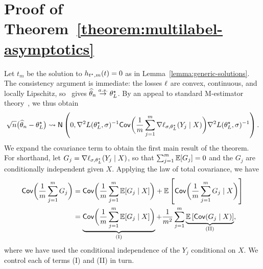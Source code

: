 \section{Proof of Theorem~\ref{theorem:multilabel-asymptotics}}
\label{sec:proof-multilabel-asymptotics}

Let $t_m$ be the solution to $h_{t^\star,m}(t) = 0$ as in
Lemma~\ref{lemma:generic-solutions}. The consistency argument is
immediate: the losses $\ell$ are convex, continuous, and locally Lipschitz,
so~\citet[Thm.~5.4]{ShapiroDeRu09} gives $\widehat{\theta}_n
\stackrel{a.s.}{\rightarrow} \theta^\star_L$. By an appeal to standard
M-estimator theory~\cite[e.g.][Thm.~5.23]{VanDerVaart98},
we thus obtain
\begin{equation}
	\label{eqn:multilabel-basic-asymptote}
	\sqrt{n} \big(\widehat{\theta}_n - \theta^\star_L\big)
	\rightsquigarrow \mathsf{N}\left(0, \nabla^2 L(\theta^\star_L, \sigma)^{-1}
	\mathsf{Cov}\bigg(\frac{1}{m} \sum_{j = 1}^m
	\nabla \ell_{\sigma,\theta^\star_L}(Y_j \mid X)\bigg)
	\nabla^2 L(\theta^\star_L, \sigma)^{-1} \right).
\end{equation}
We expand the covariance term to obtain the first main result of the
theorem. For shorthand, let $G_j = \nabla \ell_{\sigma,\theta^\star_L}(Y_j
\mid X)$, so that $\sum_{j = 1}^m \mathbb{E}[G_j] = 0$ and the $G_j$ are
conditionally independent given $X$. Applying the law of total covariance,
we have
\begin{align*}
	\mathsf{Cov}\bigg(\frac{1}{m} \sum_{j = 1}^m G_j\bigg)
	& = \mathsf{Cov}\bigg(\frac{1}{m} \sum_{j = 1}^m
	\mathbb{E}[G_j \mid X]\bigg)
	+ \mathbb{E}\left[\mathsf{Cov}\bigg(
	\frac{1}{m} \sum_{j = 1}^m G_j \mid X\bigg)\right] \\
	& =
	\underbrace{\mathsf{Cov}\bigg(\frac{1}{m} \sum_{j = 1}^m \mathbb{E}[G_j \mid X] \bigg)}_{
		\mathrm{(I)}}
	+ \frac{1}{m^2} \sum_{j = 1}^m
	\underbrace{\mathbb{E}\left[\mathsf{Cov}(G_j \mid X)\right]}_{\mathrm{(II)}},
\end{align*}
where we have used the conditional independence of the $Y_j$ conditional on
$X$.  We control each of terms (I) and (II) in turn.

